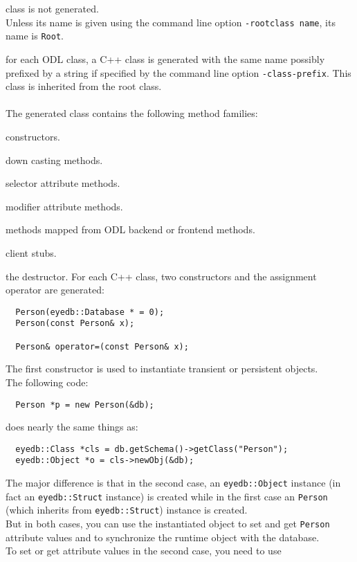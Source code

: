 class is not generated.
\\
Unless its name is given using the command line option \texttt{-rootclass name},
its name is \texttt{Root}.
\item for each ODL class, a C++ class is generated with the same name
possibly prefixed by a string if specified by the command line option
\texttt{-class-prefix}.
This class is inherited from the root class.
\\
\\
The generated class contains the following method families:
\be
\item constructors.
\item down casting methods.
\item selector attribute methods.
\item modifier attribute methods.
\item methods mapped from ODL backend or frontend methods.
\item client stubs.
\item the destructor.
\ee
\ee
{}
For each C++ class, two constructors and the assignment operator are
generated:
\verbsize
\begin{verbatim}
  Person(eyedb::Database * = 0);
  Person(const Person& x);

  Person& operator=(const Person& x);
\end{verbatim}
\normalsize
\bi
\item The first constructor is used to instantiate transient or persistent objects.
\\
The following code:
\verbsize
\begin{verbatim}
  Person *p = new Person(&db);
\end{verbatim}
\normalsize
does nearly the same things as:
\verbsize
\begin{verbatim}
  eyedb::Class *cls = db.getSchema()->getClass("Person");
  eyedb::Object *o = cls->newObj(&db);
\end{verbatim}
\normalsize
The major difference is that in the second case, an \texttt{eyedb::Object} instance
(in fact an \texttt{eyedb::Struct} instance) is created while in the first case
an \texttt{Person} (which inherits from \texttt{eyedb::Struct}) instance is created.
\\
But in both cases, you can use the instantiated object to set and get
\texttt{Person} attribute values and to synchronize the runtime object with
the database.
\\
To set or get attribute values in the second case, you need to use
